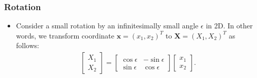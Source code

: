 \documentclass[10pt]{article}
\newcommand{\ve}[1]{\mathbf{#1}}
\begin{document}
  \subsubsection{Rotation}

  \begin{itemize}
    \item Consider a small rotation by an infinitesimally small angle $\epsilon$ in 2D. In other words, we transform coordinate $\ve{x} = (x_1, x_2)^T$ to $\ve{X} = (X_1, X_2)^T$ as follows:
    \begin{align*}
      \begin{bmatrix}
        X_1 \\ X_2
      \end{bmatrix}
      =
      \begin{bmatrix}
        \cos \epsilon & -\sin \epsilon \\
        \sin \epsilon & \cos \epsilon
      \end{bmatrix}
      \begin{bmatrix}
        x_1 \\ x_2
      \end{bmatrix}.
    \end{align*}


\end{itemize}
\end{document}
